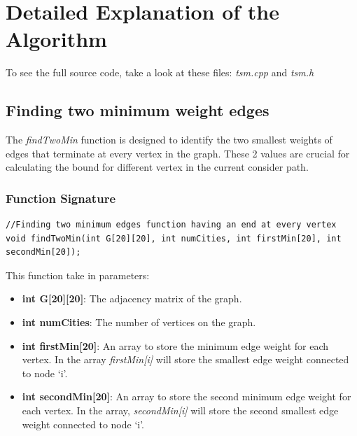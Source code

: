 \documentclass[a4paper]{article}
\begin{document}
\section{Detailed Explanation of the Algorithm}
To see the full source code, take a look at these files: \textit{tsm.cpp} and \textit{tsm.h}
\subsection{Finding two minimum weight edges}
The \textit{findTwoMin} function is designed to identify the two smallest weights of edges that terminate at every vertex in the graph. These 2 values are crucial for calculating the bound for different vertex in the current consider path.
\subsubsection{Function Signature}
\begin{verbatim}
//Finding two minimum edges function having an end at every vertex 
void findTwoMin(int G[20][20], int numCities, int firstMin[20], int secondMin[20]);
\end{verbatim}
This function take in parameters:
\begin{itemize}
    \item \textbf{int G[20][20]}: The adjacency matrix of the graph.
    \item \textbf{int numCities}: The number of vertices on the graph. 
    \item \textbf{int firstMin[20]}: An array to store the minimum edge weight for each vertex. In the array \textit{firstMin[i]} will store the smallest edge weight connected to node `i'. 
    \item \textbf{int secondMin[20]}: An array to store the second minimum edge weight for each vertex. In the array, \textit{secondMin[i]} will store the second smallest edge weight connected to node `i'.
\end{itemize}
\end{document}
